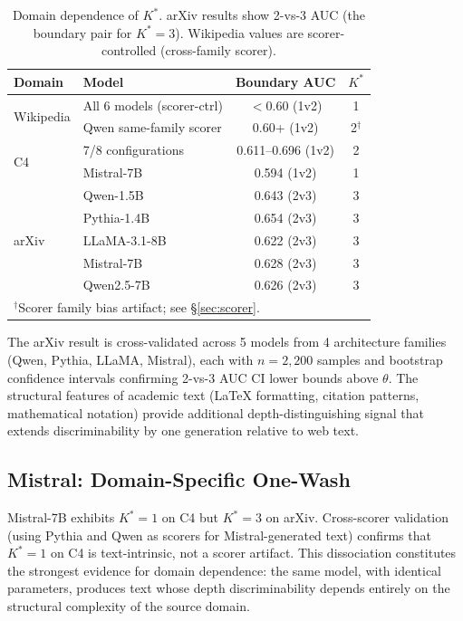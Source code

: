 \documentclass[11pt,a4paper]{article}
\newcommand{\Kstar}{K^{*}}
\begin{document}
\begin{table}[t]
\centering
\caption{Domain dependence of $\Kstar$. arXiv results show 2-vs-3 AUC (the boundary pair for $\Kstar = 3$). Wikipedia values are scorer-controlled (cross-family scorer).}
\label{tab:domain}
\small
\begin{tabular}{llcc}
\toprule
\textbf{Domain} & \textbf{Model} & \textbf{Boundary AUC} & $\Kstar$ \\
\midrule
\multirow{2}{*}{Wikipedia} & All 6 models (scorer-ctrl) & $<0.60$ (1v2) & 1 \\
                           & Qwen same-family scorer & 0.60+ (1v2) & 2$^{\dagger}$ \\
\midrule
\multirow{2}{*}{C4}        & 7/8 configurations & 0.611--0.696 (1v2) & 2 \\
                           & Mistral-7B & 0.594 (1v2) & 1 \\
\midrule
\multirow{5}{*}{arXiv}    & Qwen-1.5B & 0.643 (2v3) & 3 \\
                           & Pythia-1.4B & 0.654 (2v3) & 3 \\
                           & LLaMA-3.1-8B & 0.622 (2v3) & 3 \\
                           & Mistral-7B & 0.628 (2v3) & 3 \\
                           & Qwen2.5-7B & 0.626 (2v3) & 3 \\
\bottomrule
\multicolumn{4}{l}{\small $^{\dagger}$Scorer family bias artifact; see \S\ref{sec:scorer}.}
\end{tabular}
\end{table}

The arXiv result is cross-validated across 5 models from 4 architecture families (Qwen, Pythia, LLaMA, Mistral), each with $n = 2{,}200$ samples and bootstrap confidence intervals confirming 2-vs-3 AUC CI lower bounds above $\theta$. The structural features of academic text (LaTeX formatting, citation patterns, mathematical notation) provide additional depth-distinguishing signal that extends discriminability by one generation relative to web text.

\subsection{Mistral: Domain-Specific One-Wash}
\label{sec:mistral}

Mistral-7B exhibits $\Kstar = 1$ on C4 but $\Kstar = 3$ on arXiv. Cross-scorer validation (using Pythia and Qwen as scorers for Mistral-generated text) confirms that $\Kstar = 1$ on C4 is text-intrinsic, not a scorer artifact. This dissociation constitutes the strongest evidence for domain dependence: the same model, with identical parameters, produces text whose depth discriminability depends entirely on the structural complexity of the source domain.
\end{document}
